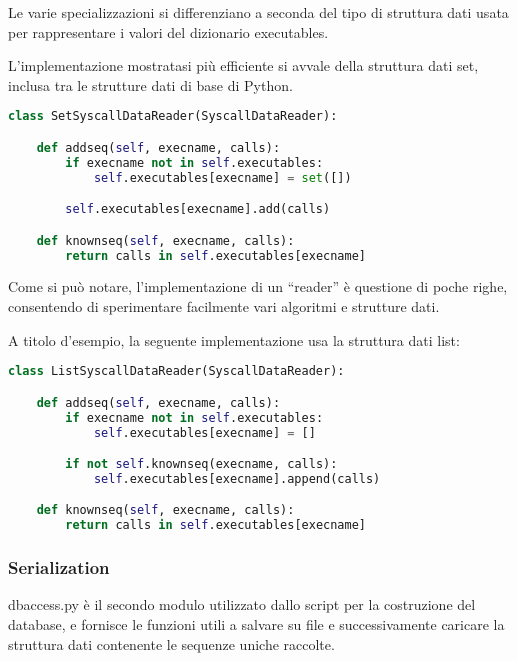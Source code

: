 \documentclass[11pt]{article}
\begin{document}
Le varie specializzazioni si differenziano a seconda del tipo di struttura dati
usata per rappresentare i valori del dizionario executables.

L'implementazione mostratasi più efficiente si avvale della struttura dati set,
inclusa tra le strutture dati di base di Python. 

\begin{lstlisting}[language=Python]
class SetSyscallDataReader(SyscallDataReader):

    def addseq(self, execname, calls):
        if execname not in self.executables:
            self.executables[execname] = set([])

        self.executables[execname].add(calls)

    def knownseq(self, execname, calls):
        return calls in self.executables[execname]
\end{lstlisting}

Come si può notare, l'implementazione di un ``reader'' è questione di poche
righe, consentendo di sperimentare facilmente vari algoritmi e strutture dati.

A titolo d'esempio, la seguente implementazione usa la struttura dati list:

\begin{lstlisting}[language=Python]
class ListSyscallDataReader(SyscallDataReader):

    def addseq(self, execname, calls):
        if execname not in self.executables:
            self.executables[execname] = []

        if not self.knownseq(execname, calls):
            self.executables[execname].append(calls)

    def knownseq(self, execname, calls):
        return calls in self.executables[execname]
\end{lstlisting}

\subsubsection{Serialization}
dbaccess.py è il secondo modulo utilizzato dallo script per la costruzione del
database, e fornisce le funzioni utili a salvare su file e successivamente
caricare la struttura dati contenente le sequenze uniche raccolte.
\end{document}
